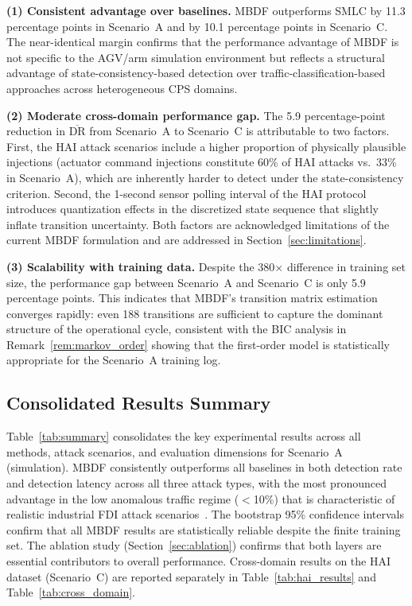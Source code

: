 \documentclass[manuscript,screen,review]{acmart}
\begin{document}
\textbf{(1) Consistent advantage over baselines.}
MBDF outperforms SMLC by 11.3 percentage points in
Scenario~A and by 10.1 percentage points in Scenario~C.
The near-identical margin confirms that the performance
advantage of MBDF is not specific to the AGV/arm
simulation environment but reflects a structural advantage
of state-consistency-based detection over
traffic-classification-based approaches across
heterogeneous CPS domains.

\textbf{(2) Moderate cross-domain performance gap.}
The 5.9 percentage-point reduction in
$\overline{\mathrm{DR}}$ from Scenario~A to Scenario~C
is attributable to two factors. First, the HAI attack
scenarios include a higher proportion of physically
plausible injections (actuator command injections
constitute 60\% of HAI attacks vs.\ 33\% in Scenario~A),
which are inherently harder to detect under the
state-consistency criterion. Second, the 1-second sensor
polling interval of the HAI protocol introduces
quantization effects in the discretized state sequence
that slightly inflate transition uncertainty. Both factors
are acknowledged limitations of the current MBDF
formulation and are addressed in
Section~\ref{sec:limitations}.

\textbf{(3) Scalability with training data.}
Despite the 380$\times$ difference in training set size,
the performance gap between Scenario~A and Scenario~C is
only 5.9 percentage points. This indicates that MBDF's
transition matrix estimation converges rapidly: even 188
transitions are sufficient to capture the dominant
structure of the operational cycle, consistent with the
BIC analysis in Remark~\ref{rem:markov_order} showing
that the first-order model is statistically appropriate
for the Scenario~A training log.
\subsection{Consolidated Results Summary}
\label{sec:summary_table}

Table~\ref{tab:summary} consolidates the key experimental
results across all methods, attack scenarios, and evaluation
dimensions for Scenario~A (simulation). MBDF consistently
outperforms all baselines in both detection rate and
detection latency across all three attack types, with the
most pronounced advantage in the low anomalous traffic
regime ($<$10\%) that is characteristic of realistic
industrial FDI attack scenarios~\cite{ref26}. The bootstrap
95\% confidence intervals confirm that all MBDF results are
statistically reliable despite the finite training set. The
ablation study (Section~\ref{sec:ablation}) confirms that
both layers are essential contributors to overall
performance. Cross-domain results on the HAI dataset
(Scenario~C) are reported separately in
Table~\ref{tab:hai_results} and Table~\ref{tab:cross_domain}.
\end{document}
